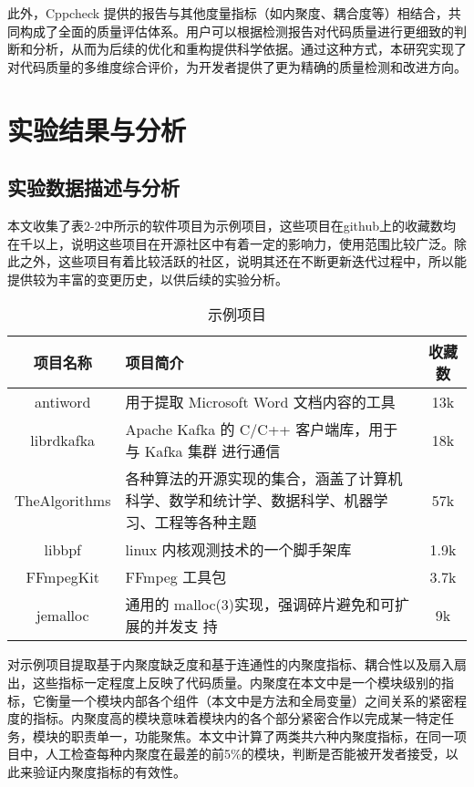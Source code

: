 此外，Cppcheck 提供的报告与其他度量指标（如内聚度、耦合度等）相结合，共同构成了全面的质量评估体系。用户可以根据检测报告对代码质量进行更细致的判断和分析，从而为后续的优化和重构提供科学依据。通过这种方式，本研究实现了对代码质量的多维度综合评价，为开发者提供了更为精确的质量检测和改进方向。


\section{实验结果与分析}

\subsection{实验数据描述与分析}
本文收集了表2-2中所示的软件项目为示例项目，这些项目在github上的收藏数均在千以上，说明这些项目在开源社区中有着一定的影响力，使用范围比较广泛。除此之外，这些项目有着比较活跃的社区，说明其还在不断更新迭代过程中，所以能提供较为丰富的变更历史，以供后续的实验分析。

\begin{table}[htbp]
\caption{示例项目}
\vspace{0.5em}\centering\wuhao
\begin{tabular}{cp{10cm}c}
\toprule
项目名称 & 项目简介 & 收藏数 \\
\midrule
antiword & 用于提取 Microsoft Word 文档内容的工具 & 13k\\
librdkafka & Apache Kafka 的 C/C++ 客户端库，用于与 Kafka 集群
进行通信 & 18k \\
TheAlgorithms & 各种算法的开源实现的集合，涵盖了计算机科学、数学和统计学、数据科学、机器学习、工程等各种主题 & 57k \\
libbpf & linux 内核观测技术的一个脚手架库 & 1.9k \\
FFmpegKit & FFmpeg 工具包 & 3.7k \\
jemalloc & 通用的 malloc(3)实现，强调碎片避免和可扩展的并发支
持 & 9k \\
\bottomrule
\end{tabular}
\end{table}

对示例项目提取基于内聚度缺乏度和基于连通性的内聚度指标、耦合性以及扇入扇出，这些指标一定程度上反映了代码质量。内聚度在本文中是一个模块级别的指标，它衡量一个模块内部各个组件（本文中是方法和全局变量）之间关系的紧密程度的指标。内聚度高的模块意味着模块内的各个部分紧密合作以完成某一特定任务，模块的职责单一，功能聚焦。本文中计算了两类共六种内聚度指标，在同一项目中，人工检查每种内聚度在最差的前5\%的模块，判断是否能被开发者接受，以此来验证内聚度指标的有效性。

